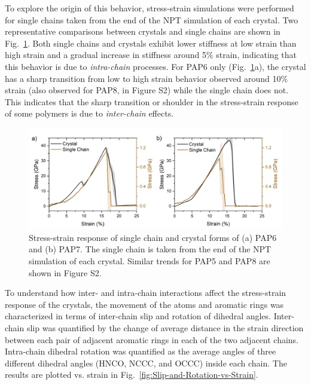 \documentclass[journal=langd5,manuscript=article]{achemso}
\begin{document}
To explore the origin of this behavior, stress-strain simulations were performed for single chains taken from the end of the NPT simulation of each crystal.
Two representative comparisons between crystals and single chains are shown in Fig.~\ref{fig:Stress-strain-Curve-SingleChain-vs-Crystal}.
Both single chains and crystals exhibit lower stiffness at low strain than high strain and a gradual increase in stiffness around 5\% strain, indicating that this behavior is due to \textit{intra-chain} processes.
For PAP6 only (Fig.~\ref{fig:Stress-strain-Curve-SingleChain-vs-Crystal}a), the crystal has a sharp transition from low to high strain behavior observed around 10\% strain (also observed for PAP8, in Figure S2) while the single chain does not. 
This indicates that the sharp transition or shoulder in the stress-strain response of some polymers is due to \textit{inter-chain} effects.


\begin{figure}[h!]
\centering
\includegraphics[scale=0.45]{Stress-strain-Curve-SingleChain-vs-Crystal.png}
\caption{Stress-strain response of single chain and crystal forms of (a) PAP6 and (b) PAP7. The single chain is taken from the end of the NPT simulation of each crystal. Similar trends for PAP5 and PAP8 are shown in Figure S2.}
\label{fig:Stress-strain-Curve-SingleChain-vs-Crystal}
\end{figure}


\FloatBarrier
To understand how inter- and intra-chain interactions affect the stress-strain response of the crystals, the movement of the atoms and aromatic rings was characterized in terms of inter-chain slip and rotation of dihedral angles.
Inter-chain slip was quantified by the change of average distance in the strain direction between each pair of adjacent aromatic rings in each of the two adjacent chains.
Intra-chain dihedral rotation was quantified as the average angles of three different dihedral angles (HNCO, NCCC, and OCCC) inside each chain.
The results are plotted vs. strain in Fig.~\ref{fig:Slip-and-Rotation-vs-Strain}.
\end{document}
